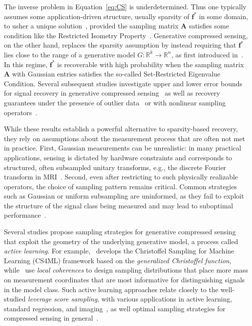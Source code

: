 \documentclass{article}
\theoremstyle{plain}
\theoremstyle{definition}
\theoremstyle{remark}
\begin{document}
The inverse problem in Equation~\ref{eq:CS} is underdetermined. Thus one typically assumes some application-driven structure, usually sparsity of $\mathbf{f}^*$ in some domain, to usher a unique solution~\cite{candes2006robust, candes2006stable, tibshirani1996regression, hastie2015statistical, pati1993orthogonal, tropp2007signal, chen2001atomic, adcock2021compressive}, provided the sampling matrix $\mathbf{A}$ satisfies some condition like the Restricted Isometry Property~\cite{donoho2006compressed, candes2006stable}. Generative compressed sensing, on the other hand, replaces the sparsity assumption by instead requiring that $\mathbf{f}^*$ lies close to the range of a generative model $G : \mathbb{R}^k \to \mathbb{R}^n$, as first introduced in~\cite{bora2017compressed}. In this regime, $\mathbf{f}^*$ is recoverable with high probability when the sampling matrix $\mathbf{A}$ with Gaussian entries satisfies the so-called Set-Restricted Eigenvalue Condition. Several subsequent studies investigate upper and lower error bounds for signal recovery in generative compressed sensing~\cite{kamath2019lower, kamath2020power, liu2020information} as well as recovery guarantees under the presence of outlier data~\cite{jalal2020robust} or with nonlinear sampling operators~\cite{chen2023unified}.

While these results establish a powerful alternative to sparsity-based recovery, they rely on assumptions about the measurement process that are often not met in practice. First, Gaussian measurements can be unrealistic: in many practical applications, sensing is dictated by hardware constraints and corresponds to structured, often subsampled unitary transforms, e.g., the discrete Fourier transform in MRI~\cite{lustig2007sparse, lustig2008compressed}. Second, even after restricting to such physically realizable operators, the choice of sampling pattern remains critical. Common strategies such as Gaussian or uniform subsampling are uninformed, as they fail to exploit the structure of the signal class being measured and may lead to suboptimal performance~\cite{adcock2017breaking, krahmer2015compressive, poon2017structure}.


Several studies propose sampling strategies for generative compressed sensing that exploit the geometry of the underlying generative model, a process called \emph{active learning}. For example,~\cite{adcock2023cs4ml} develops the Christoffel Sampling for Machine Learning (CS4ML) framework based on the \emph{generalized Christoffel function}, while~\cite{berk2023modeladapted, berk2022fourier, plan2025denoising} use \emph{local coherences} to design sampling distributions that place more mass on measurement coordinates that are most informative for distinguishing signals in the model class. Such active learning approaches relate closely to the well-studied \emph{leverage score sampling}, with various applications in active learning, standard regression, and imaging~\cite{chen2016statistical,derezinski2018leveraged,ordozgoiti2022generalized,erdelyi2020fourier,avron2019universal}, as well optimal sampling strategies for compressed sensing in general~\cite{adcock2021compressive, krahmer2015compressive, poon2017structure, candes2007compressive, krahmer2013stable, puy2011variable}. 
\end{document}
